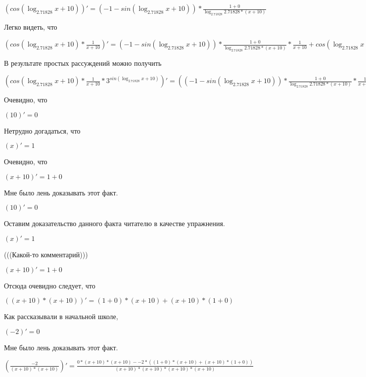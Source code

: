 \documentclass[12pt,a4paper,fleqn]{article}
\theoremstyle{definition}
\begin{document}
$(cos(\log_{ 2.71828 }{ x  +  10 }))' = ( -1  - sin(\log_{ 2.71828 }{ x  +  10 })) * \frac{ 1  +  0 }{\log_{ 2.71828 }{ 2.71828 } * ( x  +  10 )}
$

Легко видеть, что

$(cos(\log_{ 2.71828 }{ x  +  10 }) * \frac{ 1 }{ x  +  10 }
)' = ( -1  - sin(\log_{ 2.71828 }{ x  +  10 })) * \frac{ 1  +  0 }{\log_{ 2.71828 }{ 2.71828 } * ( x  +  10 )}
 * \frac{ 1 }{ x  +  10 }
 + cos(\log_{ 2.71828 }{ x  +  10 }) * \frac{ 0  * ( x  +  10 ) -  1  * ( 1  +  0 )}{( x  +  10 ) * ( x  +  10 )}
$

В результате простых рассуждений можно получить

$(cos(\log_{ 2.71828 }{ x  +  10 }) * \frac{ 1 }{ x  +  10 }
 * { 3 }^{sin(\log_{ 2.71828 }{ x  +  10 })})' = (( -1  - sin(\log_{ 2.71828 }{ x  +  10 })) * \frac{ 1  +  0 }{\log_{ 2.71828 }{ 2.71828 } * ( x  +  10 )}
 * \frac{ 1 }{ x  +  10 }
 + cos(\log_{ 2.71828 }{ x  +  10 }) * \frac{ 0  * ( x  +  10 ) -  1  * ( 1  +  0 )}{( x  +  10 ) * ( x  +  10 )}
) * { 3 }^{sin(\log_{ 2.71828 }{ x  +  10 })} + cos(\log_{ 2.71828 }{ x  +  10 }) * \frac{ 1 }{ x  +  10 }
 * \log_{ 2.71828 }{ 3 } * cos(\log_{ 2.71828 }{ x  +  10 }) * \frac{ 1  +  0 }{\log_{ 2.71828 }{ 2.71828 } * ( x  +  10 )}
 * { 3 }^{sin(\log_{ 2.71828 }{ x  +  10 })}$

Очевидно, что

$( 10 )' =  0 $

Нетрудно догадаться, что

$( x )' =  1 $

Очевидно, что

$( x  +  10 )' =  1  +  0 $

Мне было лень доказывать этот факт.

$( 10 )' =  0 $

Оставим доказательство данного факта читателю в качестве упражнения.

$( x )' =  1 $

(((Какой-то комментарий)))

$( x  +  10 )' =  1  +  0 $

Отсюда очевидно следует, что

$(( x  +  10 ) * ( x  +  10 ))' = ( 1  +  0 ) * ( x  +  10 ) + ( x  +  10 ) * ( 1  +  0 )$

Как рассказывали в начальной школе,

$( -2 )' =  0 $

Мне было лень доказывать этот факт.

$(\frac{ -2 }{( x  +  10 ) * ( x  +  10 )}
)' = \frac{ 0  * ( x  +  10 ) * ( x  +  10 ) -  -2  * (( 1  +  0 ) * ( x  +  10 ) + ( x  +  10 ) * ( 1  +  0 ))}{( x  +  10 ) * ( x  +  10 ) * ( x  +  10 ) * ( x  +  10 )}
$
\end{document}
